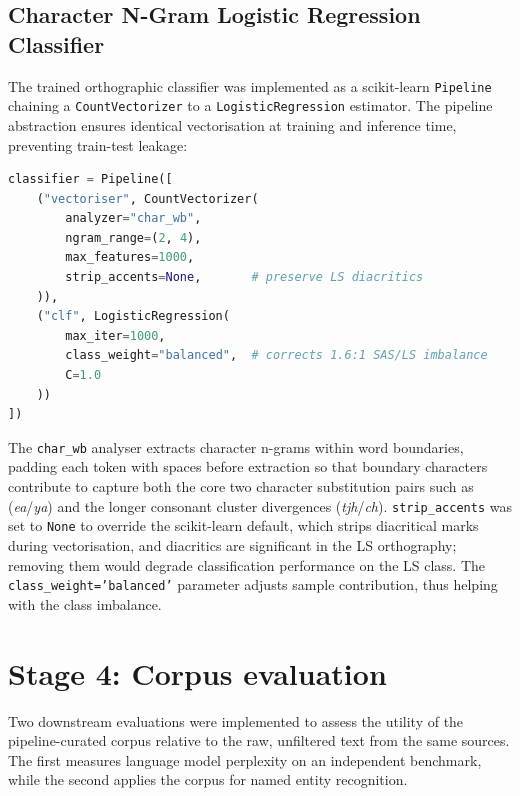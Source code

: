 \documentclass[12pt]{ThesisRU}
\begin{document}
\subsection{Character N-Gram Logistic Regression Classifier}

The trained orthographic classifier was implemented as a scikit-learn \texttt{Pipeline} chaining a \texttt{CountVectorizer} to a \texttt{LogisticRegression} estimator. The pipeline abstraction ensures identical vectorisation at training and inference time, preventing train-test leakage:

\begin{lstlisting}[language=Python, caption={Character n-gram logistic regression pipeline.}, label={lst:classifier}]
classifier = Pipeline([
    ("vectoriser", CountVectorizer(
        analyzer="char_wb",
        ngram_range=(2, 4),
        max_features=1000,
        strip_accents=None,       # preserve LS diacritics
    )),
    ("clf", LogisticRegression(
        max_iter=1000,
        class_weight="balanced",  # corrects 1.6:1 SAS/LS imbalance
        C=1.0
    ))
])
\end{lstlisting}

The \texttt{char\_wb} analyser extracts character n-grams within word boundaries, padding each token with spaces before extraction so that boundary characters contribute to capture both the core two character substitution pairs such as (\textit{ea}/\textit{ya}) and the longer consonant cluster divergences (\textit{tjh}/\textit{ch}). \texttt{strip\_accents} was set to \texttt{None} to override the scikit-learn default, which strips diacritical marks during vectorisation, and diacritics are significant in the LS orthography; removing them would degrade classification performance on the LS class. The \texttt{class\_weight='balanced'} parameter adjusts sample contribution, thus helping with the class imbalance.



\section{Stage 4: Corpus evaluation}

Two downstream evaluations were implemented to assess the utility of the pipeline-curated corpus relative to the raw, unfiltered text from the same sources. The first measures language model perplexity on an independent benchmark, while the second applies the corpus for named entity recognition.
\end{document}
